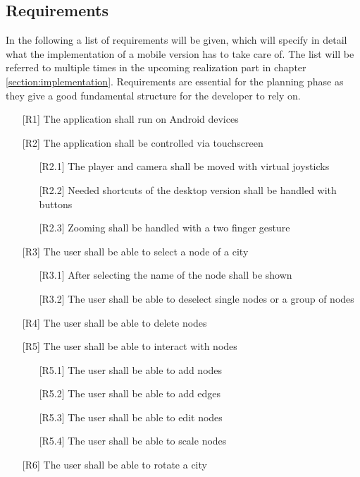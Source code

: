 \subsection{Requirements}
In the following a list of requirements will be given, which will specify in detail what the implementation of a mobile version has to take care of.
The list will be referred to multiple times in the upcoming realization part in chapter \ref{section:implementation}.
Requirements are essential for the planning phase as they give a good fundamental structure for the developer to rely on. \cite{Robertson2012,Stevens2005}
\begin{itemize}
    \item[{[R1]}] The application shall run on Android devices
    \item[{[R2]}] The application shall be controlled via touchscreen
    \begin{itemize}
        \item [{[R2.1]}] The player and camera shall be moved with virtual joysticks
        \item [{[R2.2]}] Needed shortcuts of the desktop version shall be handled with buttons
        \item [{[R2.3]}] Zooming shall be handled with a two finger gesture
    \end{itemize}
    \item[{[R3]}] The user shall be able to select a node of a \gls{city}
    \begin{itemize}
        \item [{[R3.1]}] After selecting the name of the node shall be shown
        \item [{[R3.2]}] The user shall be able to deselect single nodes or a group of nodes
    \end{itemize}
    \item[{[R4]}] The user shall be able to delete nodes
    \item[{[R5]}] The user shall be able to interact with nodes
    \begin{itemize}
        \item [{[R5.1]}] The user shall be able to add nodes
        \item [{[R5.2]}] The user shall be able to add edges
        \item [{[R5.3]}] The user shall be able to edit nodes
        \item [{[R5.4]}] The user shall be able to scale nodes
    \end{itemize}
    \item[{[R6]}] The user shall be able to rotate a \gls{city}

\end{itemize}
